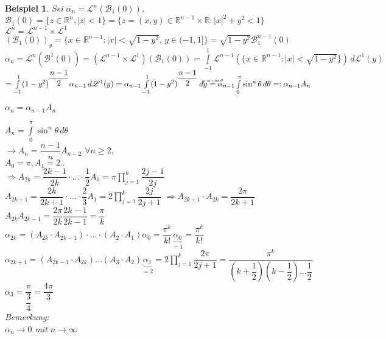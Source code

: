 \documentclass[11pt]{memoir}
\theoremstyle{changebreak}
\newtheorem{Beispiel}{Beispiel}[chapter]
\newcommand\overequal[1]{\mathrel{\overset{\makebox[0pt]{\mbox{\normalfont\tiny\sffamily $ #1 $}}}{=}}}
\begin{document}
\begin{Beispiel}
Sei $\alpha_n = \mathscr L^n(\mathscr B_1(0))$, \\
$\mathscr B_1(0) = \{z \in \mathbb R^n,|z| < 1\} = \{z = (x, y) \in \mathbb R^{n-1} \times \mathbb R: |x|^2 + y^2 <1\}$ \\
$\mathscr L^n = \mathscr L^{n-1} \times \mathscr L^1$ \\
$(\mathscr B_1(0))_y = \{x \in \mathbb R^{n-1}: |x| < \sqrt{1-y^2},\,  y \in (-1, 1]\} = \sqrt{1-y^2}\mathscr B_1^{n-1} (0)$  \\
$\alpha_n = \mathscr L^n(\mathscr B^1(0)) = (\mathscr L^{n-1} \times \mathscr L^1)(\mathscr B_1(0)) = \int\limits_{-1}^1 \mathscr L^{n-1}\left(\{x \in \mathbb R^{n-1}: |x| < \sqrt{1 -y^2}\}\right)\, d\mathscr L^1(y)$ $=\int\limits_{-1}^1 (1- y^2)^{\dfrac{n-1}{2}} \alpha_{n-1}\, d\mathscr L^1(y) = \alpha_{n-1} \int\limits_{-1}^1 (1 - y^2)^{\dfrac{n-1}{2}} \, dy \\
\overequal{y = \cos{\theta}}  \alpha_{n-1} \int\limits_0^\pi \sin^n \theta \, d\theta =: \alpha_{n-1} A_n$ \\
\begin{center}
	$\alpha_n = \alpha_{n-1} A_n$
\end{center}
$A_n = \int\limits_0^\pi \sin^n \theta\, d\theta$ \\
$\rightarrow A_n = \dfrac{n-1}{n} A_{n-2}$ $\forall n \geq 2$,\\
 $A_0 = \pi, A_1 = 2..$ \\
$\Rightarrow A_{2k} = \dfrac{2k -1}{2k} \cdotp ... \cdotp \dfrac{1}{2} A_0 = \pi \prod\limits_{j=1}^k \dfrac{2j -1}{2j}$ \\
$A_{2k+1} = \dfrac{2k}{2k+1} \cdotp ... \cdotp \dfrac{2}{3} A_1 = 2 \prod\limits_{j=1}^k \dfrac{2j}{2j+1}$
$\Rightarrow A_{2k+1} \cdotp A_{2k} = \dfrac{2\pi}{2k +1}$\\
$A_{2k} A_{2k-1} = \dfrac{2\pi}{2k} \dfrac{2k-1}{2k-1} = \dfrac{\pi}{k}$ \\
$\alpha_{2k} = (A_{2k} \cdotp A_{2k-1})\cdotp ... \cdotp (A_2 \cdotp A_1) \alpha_0 = \dfrac{\pi^k}{k!}\underbrace{\alpha_0}_{=1} = \dfrac{\pi^k}{k!}$ \\
$\alpha_{2k+1} = (A_{2k-1}\cdotp A_{2k}) ... (A_3 \cdotp A_2) \underbrace{\alpha_1}_{=2} = 2 \prod\limits_{j=1}^k \dfrac{2\pi}{2j+1} = \dfrac{\pi^k}{\left(k + \dfrac{1}{2}\right)\left(k- \dfrac{1}{2}\right)... \dfrac{1}{2}}$ \\
$\alpha_3 = \dfrac{\pi}{\dfrac{3}{4}} = \dfrac{4\pi}{3}$ \\
\emph{Bemerkung}: \\
$\alpha_n \rightarrow 0$ mit $n \rightarrow \infty$
\end{Beispiel}
\end{document}
